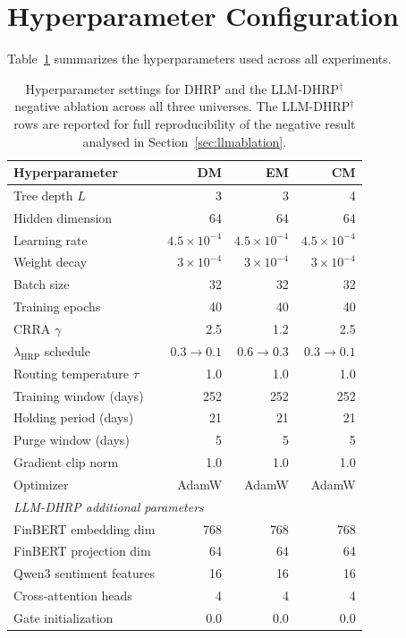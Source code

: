 \documentclass{article}
\begin{document}
\section{Hyperparameter Configuration}
\label{app:hyperparams}

Table~\ref{tab:hyperparams} summarizes the hyperparameters used across all experiments.

\begin{table}[h]
\centering
\caption{Hyperparameter settings for DHRP and the LLM-DHRP$^{\dagger}$ negative ablation across all three universes. The LLM-DHRP$^{\dagger}$ rows are reported for full reproducibility of the negative result analysed in Section~\ref{sec:llmablation}.}
\label{tab:hyperparams}
\begin{tabular}{lrrr}
\toprule
Hyperparameter & DM & EM & CM \\
\midrule
Tree depth $L$ & 3 & 3 & 4 \\
Hidden dimension & 64 & 64 & 64 \\
Learning rate & $4.5 \times 10^{-4}$ & $4.5 \times 10^{-4}$ & $4.5 \times 10^{-4}$ \\
Weight decay & $3 \times 10^{-4}$ & $3 \times 10^{-4}$ & $3 \times 10^{-4}$ \\
Batch size & 32 & 32 & 32 \\
Training epochs & 40 & 40 & 40 \\
CRRA $\gamma$ & 2.5 & 1.2 & 2.5 \\
$\lambda_{\text{HRP}}$ schedule & $0.3 \to 0.1$ & $0.6 \to 0.3$ & $0.3 \to 0.1$ \\
Routing temperature $\tau$ & 1.0 & 1.0 & 1.0 \\
Training window (days) & 252 & 252 & 252 \\
Holding period (days) & 21 & 21 & 21 \\
Purge window (days) & 5 & 5 & 5 \\
Gradient clip norm & 1.0 & 1.0 & 1.0 \\
Optimizer & AdamW & AdamW & AdamW \\
\midrule
\multicolumn{4}{l}{\textit{LLM-DHRP additional parameters}} \\
FinBERT embedding dim & 768 & 768 & 768 \\
FinBERT projection dim & 64 & 64 & 64 \\
Qwen3 sentiment features & 16 & 16 & 16 \\
Cross-attention heads & 4 & 4 & 4 \\
Gate initialization & 0.0 & 0.0 & 0.0 \\
\bottomrule
\end{tabular}
\end{table}
\end{document}
